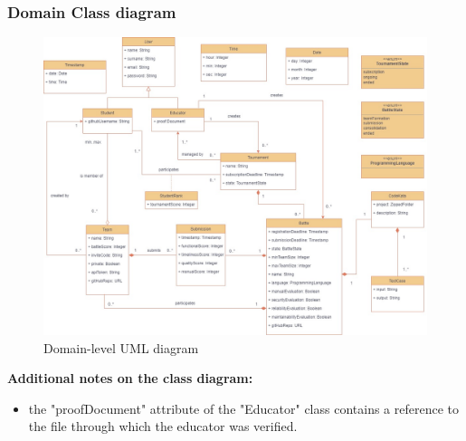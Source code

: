 \begin{enumerate}[label=\textbf{\arabic*}.]
\end{enumerate}

\subsubsection{Domain Class diagram}
\begin{figure}[H]
    \hspace{-98px}
    \includegraphics[scale=0.5]{Diagrams/uml_v2.jpg}
    \caption{Domain-level UML diagram}
    \label{class_diagram}
\end{figure}
\newpage
\textbf{ Additional notes on the class diagram:}
\begin{itemize}
    \item the "proofDocument" attribute of the "Educator" class contains a reference to the file through which the educator was verified.
\end{itemize}

